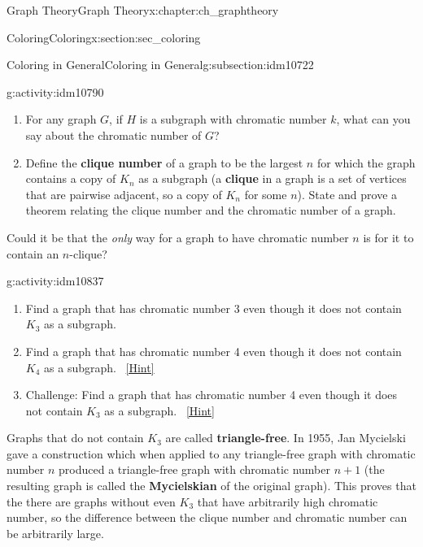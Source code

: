 \documentclass[oneside,10pt,]{book}
\newcommand{\terminology}[1]{\textbf{#1}}
\numberwithin{equation}{chapter}
\newcommand{\vtx}[2]{node[fill,circle,inner sep=0pt, minimum size=4pt,label=#1:#2]{}}
\renewcommand{\v}{\vtx{above}{}}
\begin{document}
\begin{chapterptx}{Graph Theory}{}{Graph Theory}{}{}{x:chapter:ch_graphtheory}
\begin{sectionptx}{Coloring}{}{Coloring}{}{}{x:section:sec_coloring}
\begin{subsectionptx}{Coloring in General}{}{Coloring in General}{}{}{g:subsection:idm10722}
\begin{activity}{}{g:activity:idm10790}
\begin{enumerate}[font=\bfseries,label=(\alph*),ref=\alph*]
\begin{sidebyside}{1}{0.375}{0.375}{0}
\begin{sbspanel}{0.25}
{
}%
\end{sbspanel}%
\end{sidebyside}%
\qquad~\hfill{\tiny\hyperlink{g:hint:idm10797-back}{[Hint]}}\item{}For any graph \(G\), if \(H\) is a subgraph with chromatic number \(k\), what can you say about the chromatic number of \(G\)?%
\item{}Define the \terminology{clique number} of a graph to be the largest \(n\) for which the graph contains a copy of \(K_n\) as a subgraph (a \terminology{clique} in a graph is a set of vertices that are pairwise adjacent, so a copy of \(K_n\) for some \(n\)).  State and prove a theorem relating the clique number and the chromatic number of a graph.%
\end{enumerate}
\end{activity}
Could it be that the \emph{only} way for a graph to have chromatic number \(n\) is for it to contain an \(n\)-clique?%
\begin{activity}{}{g:activity:idm10837}%
\begin{enumerate}[font=\bfseries,label=(\alph*),ref=\alph*]
\item{}Find a graph that has chromatic number 3 even though it does not contain \(K_3\) as a subgraph.%
\item{}Find a graph that has chromatic number 4 even though it does not contain \(K_4\) as a subgraph.%
\qquad~\hfill{\tiny\hyperlink{g:hint:idm10849-back}{[Hint]}}\item{}Challenge: Find a graph that has chromatic number 4 even though it does not contain \(K_3\) as a subgraph.%
\qquad~\hfill{\tiny\hyperlink{g:hint:idm10863-back}{[Hint]}}\end{enumerate}
\end{activity}
Graphs that do not contain \(K_3\) are called \terminology{triangle-free}.  In 1955, Jan Mycielski gave a construction which when applied to any triangle-free graph with chromatic number \(n\) produced a triangle-free graph with chromatic number \(n+1\) (the resulting graph is called the \terminology{Mycielskian} of the original graph).  This proves that the there are graphs without even \(K_3\) that have arbitrarily high chromatic number, so the difference between the clique number and chromatic number can be arbitrarily large.%

\end{subsectionptx}
\end{sectionptx}
\end{chapterptx}
\end{document}
